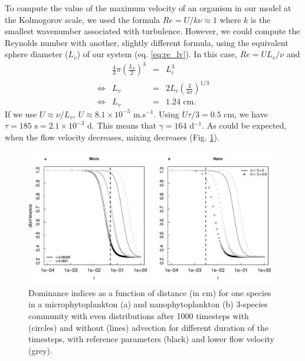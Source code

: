 \documentclass[english]{article}
\begin{document}
To compute the value of the maximum velocity of an organism in our
model at the Kolmogorov scale, we used the formula $Re=U/k\nu\approx1$
where $k$ is the smallest wavenumber associated with turbulence.
However, we could compute the Reynolds number with another, slightly
different formula, using the equivalent sphere diameter ($L_{v}$)
of our system (eq. \ref{eq:re_lv}). In this case, $Re=UL_{v}/\nu$
and
\begin{equation}
\begin{array}{cccc}
 & \frac{4}{3}\pi\left(\frac{L_{v}}{2}\right)^{3} & = & L_{c}^{3}\\
\Leftrightarrow & L_{v} & = & 2L_{c}\left(\frac{3}{4\pi}\right)^{1/3}\\
\Leftrightarrow & L_{v} & = & 1.24\text{ cm}.
\end{array}\label{eq:re_lv}
\end{equation}
If we use $U\approx\nu/L_{v}$, $U\approx8.1\times10^{-5}$ m.s$^{-1}$.
Using $U\tau/3=0.5$ cm, we have $\tau=185\text{ s}=2.1\times10^{-3}$
d. This means that $\gamma=164$ d$^{-1}$. As could be expected,
when the flow velocity decreases, mixing decreases (Fig. \ref{fig:Dominance_advection}).

\begin{figure}[H]
\begin{centering}
\includegraphics[width=0.99\textwidth]{../code/figure/theoretical_dominance_with_adv}
\par\end{centering}
\caption{Dominance indices as a function of distance (in cm) for one species
in a microphytoplankton (a) and nanophytoplankton (b) 3-species community
with even distributions after 1000 timesteps with (circles) and without
(lines) advection for different duration of the timesteps, with reference
parameters (black) and lower flow velocity (grey). \label{fig:Dominance_advection}}

\end{figure}
\end{document}
